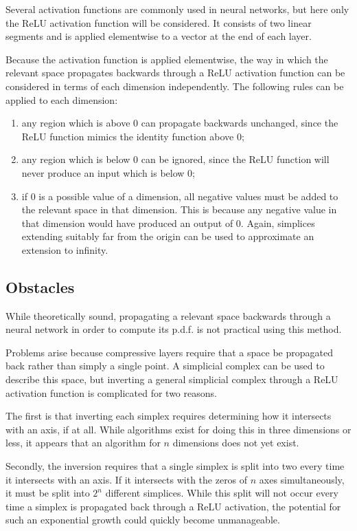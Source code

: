 \documentclass[../../main.tex]{subfiles}
\begin{document}
Several activation functions are commonly used in neural networks, but here only the ReLU activation function will be considered.
It consists of two linear segments and is applied elementwise to a vector at the end of each layer.

Because the activation function is applied elementwise, the way in which the relevant space propagates backwards through a ReLU activation function can be considered in terms of each dimension independently.
The following rules can be applied to each dimension:
\begin{enumerate}
    \item any region which is above $0$ can propagate backwards unchanged, since the ReLU function mimics the identity function above $0$;
    \item any region which is below $0$ can be ignored, since the ReLU function will never produce an input which is below $0$;
    \item if $0$ is a possible value of a dimension, all negative values must be added to the relevant space in that dimension.
    This is because any negative value in that dimension would have produced an output of $0$.
    Again, simplices extending suitably far from the origin can be used to approximate an extension to infinity.
\end{enumerate}

\subsection{Obstacles} \label{subsection:obstacles}

While theoretically sound, propagating a relevant space backwards through a neural network in order to compute its p.d.f. is not practical using this method.

Problems arise because compressive layers require that a space be propagated back rather than simply a single point.
A simplicial complex can be used to describe this space, but inverting a general simplicial complex through a ReLU activation function is complicated for two reasons.

The first is that inverting each simplex requires determining how it intersects with an axis, if at all.
While algorithms exist for doing this in three dimensions or less, it appears that an algorithm for $n$ dimensions does not yet exist.

Secondly, the inversion requires that a single simplex is split into two every time it intersects with an axis.
If it intersects with the zeros of $n$ axes simultaneously, it must be split into $2^n$ different simplices.
While this split will not occur every time a simplex is propagated back through a ReLU activation, the potential for such an exponential growth could quickly become unmanageable.
\end{document}
